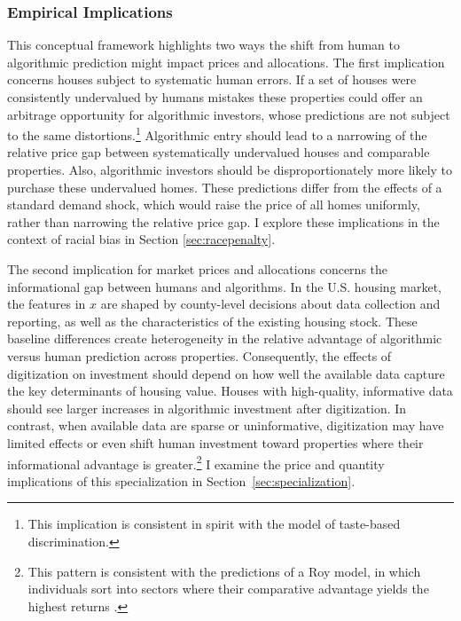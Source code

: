 \documentclass[11pt]{article}
\begin{document}
\subsubsection{Empirical Implications}


This conceptual framework highlights two ways the shift from human to algorithmic prediction might impact prices and allocations. The first implication concerns houses subject to systematic human errors. If a set of houses were consistently undervalued by humans mistakes these properties could offer an arbitrage opportunity for algorithmic investors, whose predictions are not subject to the same distortions.\footnote{This implication is consistent in spirit with the \citet{becker1957} model of taste-based discrimination.} Algorithmic entry should lead to a narrowing of the relative price gap between systematically undervalued houses and comparable properties. Also, algorithmic investors should be disproportionately more likely to purchase these undervalued homes. These predictions differ from the effects of a standard demand shock, which would raise the price of all homes uniformly, rather than narrowing the relative price gap. I explore these implications in the context of racial bias in Section \ref{sec:racepenalty}. 


The second implication for market prices and allocations concerns the informational gap between humans and algorithms. In the U.S. housing market, the features in $x$ are shaped by county-level decisions about data collection and reporting, as well as the characteristics of the existing housing stock. These baseline differences create heterogeneity in the relative advantage of algorithmic versus human prediction across properties. Consequently, the effects of digitization on investment should depend on how well the available data capture the key determinants of housing value. Houses with high-quality, informative data should see larger increases in algorithmic investment after digitization. In contrast, when available data are sparse or uninformative, digitization may have limited effects or even shift human investment toward properties where their informational advantage is greater.\footnote{This pattern is consistent with the predictions of a Roy model, in which individuals sort into sectors where their comparative advantage yields the highest returns \citep{roy1951}.} I examine the price and quantity implications of this specialization in Section~\ref{sec:specialization}.
\end{document}
